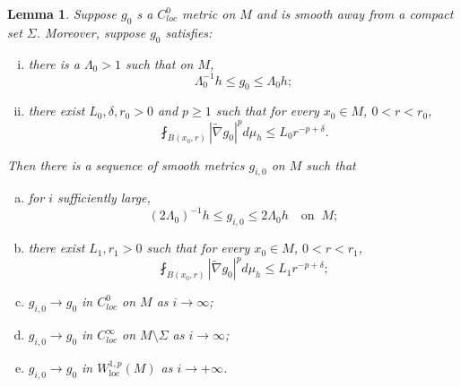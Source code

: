 \documentclass[12pt]{amsart}
\theoremstyle{plain}
\theoremstyle{plain}
\newtheorem{lemma}[subsection]{Lemma}
\theoremstyle{definition}
\theoremstyle{remark}
\numberwithin{equation}{subsection}
\newcommand{\hdel}{\tilde{\nabla}}
\begin{document}
\begin{lemma}\label{lem:mollification-scheme}
    Suppose $g_0$ s a $C^0_{loc}$ metric on $M$ and  is smooth away from a compact set $\Sigma$. Moreover, suppose $g_0$ satisfies:
    \begin{enumerate}[(i)]
        \item there is a $\Lambda_0 > 1$ such that on $M$,
        \begin{equation*}
            \Lambda_0^{-1}h \leq g_0 \leq \Lambda_0 h;
        \end{equation*}
        \item   there exist $L_0,\delta,r_0 > 0$ and $p\geq 1$ such that for every $x_0 \in M$, $0 < r < r_0$,
        \begin{equation*}
            \fint_{B(x_0,r)} |\hdel g_0|^p d\mu_h \leq L_0 r^{-p+\delta}.
        \end{equation*}
    \end{enumerate}
    Then there is a sequence of smooth metrics $g_{i,0}$ on $M$ such that %
    \begin{enumerate}[(a)]
        \item for $i$ sufficiently large,
        \begin{equation*}
            (2\Lambda_0)^{-1}h \leq g_{i,0} \leq 2\Lambda_0 h\quad\text{on}\;\;M;
        \end{equation*}
        \item  there exist $L_1,r_1 > 0$  such that for every $x_0 \in M$, $0 < r < r_1$,
        \begin{equation*}
            \fint_{B(x_0,r)} |\hdel g_0|^p d\mu_h \leq L_1 r^{-p+\delta};
        \end{equation*}
        \item $g_{i,0} \to g_0$ in $C^0_{loc}$ on $M$ as $i \to \infty$;
        \item $g_{i,0} \to g_0$ in $C^\infty_{loc}$ on $M\setminus\Sigma$ as $i \to \infty$;
        \item $g_{i,0} \to g_0$ in $W^{1,p}_\text{loc}(M)$ as $i\to+\infty$.
    \end{enumerate}
\end{lemma}
\end{document}
